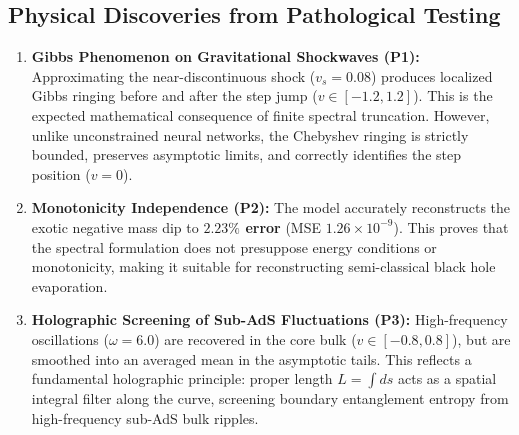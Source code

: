 \documentclass[11pt,a4paper]{article}
\begin{document}
\begin{table}[h!]
\centering
{}
\caption{\textbf{Pathological Stress-Test Performance Metrics.} $^*$First run includes JAX compilation.}
\label{tab:pathological}
\end{table}

\subsection{Physical Discoveries from Pathological Testing}
\begin{enumerate}
    \item \textbf{Gibbs Phenomenon on Gravitational Shockwaves (P1):}
    Approximating the near-discontinuous shock ($v_s = 0.08$) produces localized Gibbs ringing before and after the step jump ($v \in [-1.2, 1.2]$). This is the expected mathematical consequence of finite spectral truncation. However, unlike unconstrained neural networks, the Chebyshev ringing is strictly bounded, preserves asymptotic limits, and correctly identifies the step position ($v = 0$).
    \item \textbf{Monotonicity Independence (P2):}
    The model accurately reconstructs the exotic negative mass dip to \textbf{$2.23\%$ error} (MSE $1.26 \times 10^{-9}$). This proves that the spectral formulation does not presuppose energy conditions or monotonicity, making it suitable for reconstructing semi-classical black hole evaporation.
    \item \textbf{Holographic Screening of Sub-AdS Fluctuations (P3):}
    High-frequency oscillations ($\omega = 6.0$) are recovered in the core bulk ($v \in [-0.8, 0.8]$), but are smoothed into an averaged mean in the asymptotic tails. This reflects a fundamental holographic principle: proper length $L = \int ds$ acts as a spatial integral filter along the curve, screening boundary entanglement entropy from high-frequency sub-AdS bulk ripples.
\end{enumerate}
\end{document}
